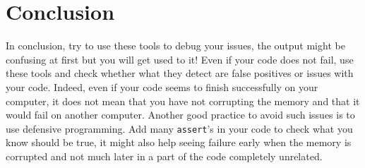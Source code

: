 \documentclass{article}
\begin{document}
\section{Conclusion}

In conclusion, try to use these tools to debug your issues, the output might be confusing at first but you will get used to it!
Even if your code does not fail, use these tools and check whether what they detect are false positives or issues with your code.
Indeed, even if your code seems to finish successfully on your computer, it does not mean that you have not corrupting the memory and that it would fail on another computer.
Another good practice to avoid such issues is to use defensive programming. Add many \texttt{assert}'s in your code to check what you know should be true, it might also help seeing failure early when the memory is corrupted and not much later in a part of the code completely unrelated.
\end{document}
